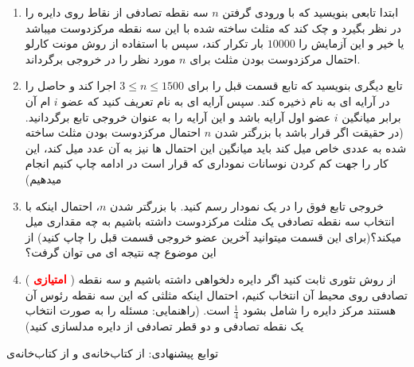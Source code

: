 \documentclass[a4paper]{article}
\begin{document}
\begin{enumerate}
	\item
ابتدا تابعی بنویسید که با ورودی گرفتن
$n$
سه نقطه تصادفی از نقاط روی دایره را در نظر بگیرد و چک کند که مثلث ساخته شده با این سه  نقطه مرکزدوست میباشد یا خیر و این آزمایش را $10000$ بار تکرار کند، سپس با استفاده از روش مونت کارلو احتمال مرکزدوست بودن مثلث برای $n$ مورد نظر را در خروجی برگرداند.
	\item
تابع دیگری بنویسید که تابع قسمت قبل را برای
$3 \leq n \leq 1500$
اجرا کند و حاصل را در آرایه ای به نام 
ذخیره کند. سپس آرایه ای به نام
تعریف کنید که عضو $i$ ام آن برابر میانگین $i$ عضو اول آرایه
باشد و این آرایه را به عنوان خروجی تابع برگردانید.(در حقیقت اگر قرار باشد با بزرگتر شدن $n$ احتمال مرکزدوست بودن مثلث ساخته شده به عددی خاص میل کند باید میانگین این احتمال ها نیز به آن عدد میل کند، این کار را جهت کم کردن نوسانات نموداری که قرار است در ادامه چاپ کنیم انجام میدهیم)
	\item
خروجی تابع فوق را در یک نمودار رسم کنید. با بزرگتر شدن $n$، احتمال اینکه با انتخاب سه نقطه تصادفی یک مثلث مرکزدوست داشته باشیم به چه مقداری میل میکند؟(برای این قسمت میتوانید آخرین عضو خروجی قسمت قبل را چاپ کنید) از این موضوع چه نتیجه ای می توان گرفت؟
	\item
(
\textcolor{red}{\textbf{امتیازی}}
)
از روش تئوری ثابت کنید اگر دایره دلخواهی داشته باشیم و سه نقطه تصادفی روی محیط آن انتخاب کنیم، احتمال اینکه مثلثی که این سه نقطه رئوس آن هستند مرکز دایره را شامل بشود
$\frac{1}{4}$
است. (راهنمایی: مسئله را به صورت انتخاب یک نقطه تصادفی و دو قطر تصادفی از دایره مدلسازی کنید)
\\
\end{enumerate}
توابع پیشنهادی:
از کتاب‌خانه‌ی 
و 
از کتاب‌خانه‌ی
\end{document}
